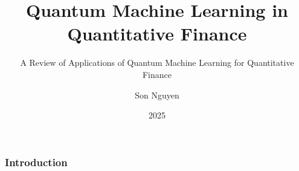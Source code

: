 \documentclass{beamer}
\title{Quantum Machine Learning in Quantitative Finance}
\subtitle{A Review of Applications of Quantum Machine Learning for Quantitative
Finance}
\author{Son Nguyen}
\institute{Stevens Institute of Technology}
\date{2025}
\begin{document}
\frame{\titlepage}
\begin{frame}
    \frametitle{Introduction}

    

\end{frame}
\end{document}
